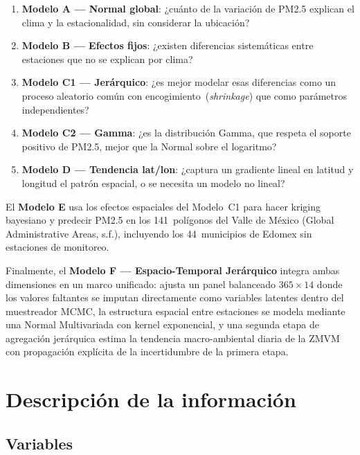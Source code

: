 ﻿\documentclass[12pt]{article}
\begin{document}
\begin{enumerate}
  \item \textbf{Modelo A --- Normal global}: ¿cu\'anto de la variaci\'on de PM2.5
        explican el clima y la estacionalidad, sin considerar la ubicaci\'on?
  \item \textbf{Modelo B --- Efectos fijos}: ¿existen diferencias sistem\'aticas
        entre estaciones que no se explican por clima?
  \item \textbf{Modelo C1 --- Jer\'arquico}: ¿es mejor modelar esas diferencias
        como un proceso aleatorio com\'un con encogimiento~(\emph{shrinkage})
        que como par\'ametros independientes?
  \item \textbf{Modelo C2 --- Gamma}: ¿es la distribuci\'on Gamma, que respeta
        el soporte positivo de PM2.5, mejor que la Normal sobre el logaritmo?
  \item \textbf{Modelo D --- Tendencia lat/lon}: ¿captura un gradiente lineal
        en latitud y longitud el patr\'on espacial, o se necesita un modelo
        no lineal?
\end{enumerate}

El \textbf{Modelo E} usa los efectos espaciales del Modelo~C1
para hacer kriging bayesiano y predecir PM2.5 en los 141~pol\'igonos del
Valle de M\'exico (Global Administrative Areas, s.f.), incluyendo los
44~municipios de Edomex sin estaciones de monitoreo.

Finalmente, el \textbf{Modelo F --- Espacio-Temporal Jer\'arquico} integra
ambas dimensiones en un marco unificado: ajusta un panel balanceado
$365 \times 14$ donde los valores faltantes se imputan directamente
como variables latentes dentro del muestreador MCMC, la estructura
espacial entre estaciones se modela mediante una Normal Multivariada
con kernel exponencial, y una segunda etapa de agregaci\'on jer\'arquica
estima la tendencia macro-ambiental diaria de la ZMVM con propagaci\'on
expl\'icita de la incertidumbre de la primera etapa.


\section{Descripci\'on de la informaci\'on}

\subsection*{Variables}
\end{document}
